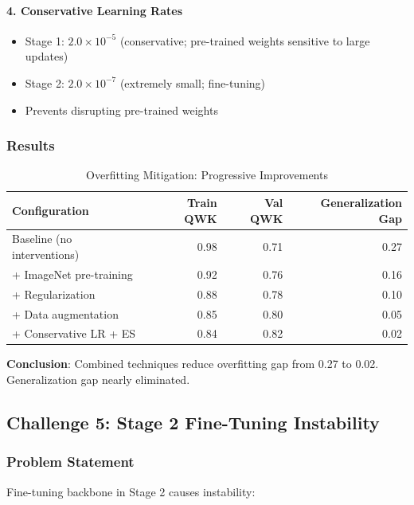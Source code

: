 \documentclass[12pt,a4paper]{article}
\begin{document}
\paragraph{4. Conservative Learning Rates}

\begin{itemize}
    \item Stage 1: $2.0 \times 10^{-5}$ (conservative; pre-trained weights sensitive to large updates)
    \item Stage 2: $2.0 \times 10^{-7}$ (extremely small; fine-tuning)
    \item Prevents disrupting pre-trained weights
\end{itemize}

\subsubsection{Results}

\begin{table}[H]
\centering
\small
\caption{Overfitting Mitigation: Progressive Improvements}
\begin{tabular}{|l|r|r|r|}
\hline
\textbf{Configuration} & \textbf{Train QWK} & \textbf{Val QWK} & \textbf{Generalization Gap} \\
\hline
Baseline (no interventions) & 0.98 & 0.71 & 0.27 \\
+ ImageNet pre-training & 0.92 & 0.76 & 0.16 \\
+ Regularization & 0.88 & 0.78 & 0.10 \\
+ Data augmentation & 0.85 & 0.80 & 0.05 \\
+ Conservative LR + ES & 0.84 & 0.82 & 0.02 \\
\hline
\end{tabular}
\end{table}

\textbf{Conclusion}: Combined techniques reduce overfitting gap from 0.27 to 0.02. Generalization gap nearly eliminated.

\subsection{Challenge 5: Stage 2 Fine-Tuning Instability}

\subsubsection{Problem Statement}

Fine-tuning backbone in Stage 2 causes instability:
\end{document}
